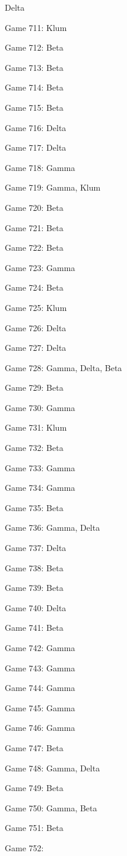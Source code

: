 \documentclass{article}
\begin{document}
\begin{multicols}{3}
\begin{compactitem}
Delta
\item Game 711:
Klum
\item Game 712:
Beta
\item Game 713:
Beta
\item Game 714:
Beta
\item Game 715:
Beta
\item Game 716:
Delta
\item Game 717:
Delta
\item Game 718:
Gamma
\item Game 719:
Gamma, Klum
\item Game 720:
Beta
\item Game 721:
Beta
\item Game 722:
Beta
\item Game 723:
Gamma
\item Game 724:
Beta
\item Game 725:
Klum
\item Game 726:
Delta
\item Game 727:
Delta
\item Game 728:
Gamma, Delta, Beta
\item Game 729:
Beta
\item Game 730:
Gamma
\item Game 731:
Klum
\item Game 732:
Beta
\item Game 733:
Gamma
\item Game 734:
Gamma
\item Game 735:
Beta
\item Game 736:
Gamma, Delta
\item Game 737:
Delta
\item Game 738:
Beta
\item Game 739:
Beta
\item Game 740:
Delta
\item Game 741:
Beta
\item Game 742:
Gamma
\item Game 743:
Gamma
\item Game 744:
Gamma
\item Game 745:
Gamma
\item Game 746:
Gamma
\item Game 747:
Beta
\item Game 748:
Gamma, Delta
\item Game 749:
Beta
\item Game 750:
Gamma, Beta
\item Game 751:
Beta
\item Game 752:

\end{compactitem}
\end{multicols}
\end{document}
